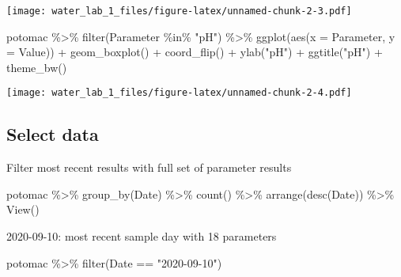 \documentclass[
]{article}
\newenvironment{Shaded}{\begin{snugshade}}{\end{snugshade}}
\newcommand{\AttributeTok}[1]{\textcolor[rgb]{0.77,0.63,0.00}{#1}}
\newcommand{\FunctionTok}[1]{\textcolor[rgb]{0.00,0.00,0.00}{#1}}
\newcommand{\NormalTok}[1]{#1}
\newcommand{\SpecialCharTok}[1]{\textcolor[rgb]{0.00,0.00,0.00}{#1}}
\newcommand{\StringTok}[1]{\textcolor[rgb]{0.31,0.60,0.02}{#1}}
\begin{document}
\texttt{[image: water\_lab\_1\_files/figure-latex/unnamed-chunk-2-3.pdf]}

\begin{Shaded}
\begin{Highlighting}[]
\NormalTok{potomac }\SpecialCharTok{\%\textgreater{}\%} 
  \FunctionTok{filter}\NormalTok{(Parameter }\SpecialCharTok{\%in\%} \StringTok{"pH"}\NormalTok{) }\SpecialCharTok{\%\textgreater{}\%} 
  \FunctionTok{ggplot}\NormalTok{(}\FunctionTok{aes}\NormalTok{(}\AttributeTok{x =}\NormalTok{ Parameter, }\AttributeTok{y =}\NormalTok{ Value)) }\SpecialCharTok{+}
    \FunctionTok{geom\_boxplot}\NormalTok{() }\SpecialCharTok{+}
    \FunctionTok{coord\_flip}\NormalTok{() }\SpecialCharTok{+}
    \FunctionTok{ylab}\NormalTok{(}\StringTok{"pH"}\NormalTok{) }\SpecialCharTok{+}
    \FunctionTok{ggtitle}\NormalTok{(}\StringTok{"pH"}\NormalTok{) }\SpecialCharTok{+}
    \FunctionTok{theme\_bw}\NormalTok{()}
\end{Highlighting}
\end{Shaded}

\texttt{[image: water\_lab\_1\_files/figure-latex/unnamed-chunk-2-4.pdf]}

\hypertarget{select-data}{%
\subsection{Select data}\label{select-data}}

Filter most recent results with full set of parameter results

\begin{Shaded}
\begin{Highlighting}[]
\NormalTok{potomac }\SpecialCharTok{\%\textgreater{}\%} 
  \FunctionTok{group\_by}\NormalTok{(Date) }\SpecialCharTok{\%\textgreater{}\%}
    \FunctionTok{count}\NormalTok{() }\SpecialCharTok{\%\textgreater{}\%} 
    \FunctionTok{arrange}\NormalTok{(}\FunctionTok{desc}\NormalTok{(Date)) }\SpecialCharTok{\%\textgreater{}\%} 
  \FunctionTok{View}\NormalTok{()}
\end{Highlighting}
\end{Shaded}

2020-09-10: most recent sample day with 18 parameters

\begin{Shaded}
\begin{Highlighting}[]
\NormalTok{potomac }\SpecialCharTok{\%\textgreater{}\%} 
  \FunctionTok{filter}\NormalTok{(Date }\SpecialCharTok{==} \StringTok{"2020{-}09{-}10"}\NormalTok{)}
\end{Highlighting}
\end{Shaded}
\end{document}

